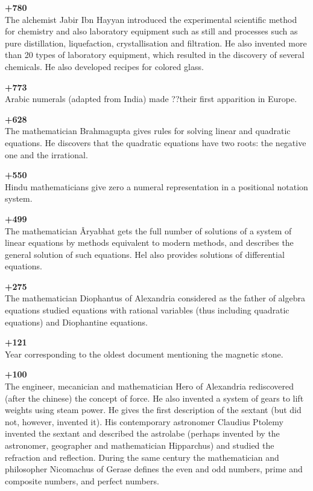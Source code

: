 \textbf{+780}\\
The alchemist Jabir Ibn Hayyan introduced the experimental scientific method for chemistry and also laboratory equipment such as still and processes such as pure distillation, liquefaction, crystallisation and filtration. He also invented more than 20 types of laboratory equipment, which resulted in the discovery of several chemicals. He also developed recipes for colored glass.

\textbf{+773}\\
Arabic numerals (adapted from India) made ??their first apparition in Europe.

\textbf{+628}\\
The mathematician Brahmagupta gives rules for solving linear and quadratic equations. He discovers that the quadratic equations have two roots: the negative one and the irrational.

\textbf{+550}\\
Hindu mathematicians give zero a numeral representation in a positional notation system.

\textbf{+499}\\
The mathematician Âryabhat gets the full number of solutions of a system of linear equations by methods equivalent to modern methods, and describes the general solution of such equations. Hel also provides solutions of differential equations.

\textbf{+275}\\
The mathematician Diophantus of Alexandria considered as the father of algebra equations studied equations with rational variables (thus including quadratic equations) and Diophantine equations.

\textbf{+121}\\
Year corresponding to the oldest document mentioning the magnetic stone.

\textbf{+100}\\
The engineer, mecanician and mathematician Hero of Alexandria rediscovered (after the chinese) the concept of force. He also invented a system of gears to lift weights using steam power. He gives the first description of the sextant (but did not, however, invented it). His contemporary astronomer Claudius Ptolemy invented the sextant and described the astrolabe (perhaps invented by the astronomer, geographer and mathematician Hipparchus) and studied the refraction and reflection. During the same century the mathematician and philosopher Nicomachus of Gerase defines the even and odd numbers, prime and composite numbers, and perfect numbers.


